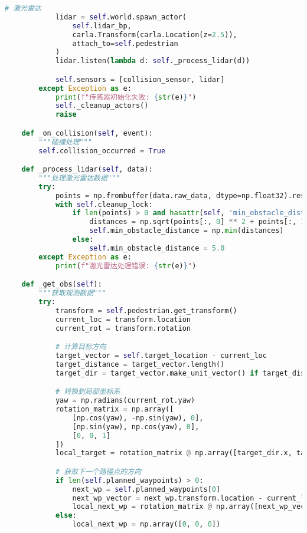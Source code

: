 \begin{lstlisting}[language=Python]
            # 激光雷达
            lidar = self.world.spawn_actor(
                self.lidar_bp,
                carla.Transform(carla.Location(z=2.5)),
                attach_to=self.pedestrian
            )
            lidar.listen(lambda d: self._process_lidar(d))

            self.sensors = [collision_sensor, lidar]
        except Exception as e:
            print(f"传感器初始化失败: {str(e)}")
            self._cleanup_actors()
            raise

    def _on_collision(self, event):
        """碰撞处理"""
        self.collision_occurred = True

    def _process_lidar(self, data):
        """处理激光雷达数据"""
        try:
            points = np.frombuffer(data.raw_data, dtype=np.float32).reshape(-1, 4)
            with self.cleanup_lock:
                if len(points) > 0 and hasattr(self, 'min_obstacle_distance'):
                    distances = np.sqrt(points[:, 0] ** 2 + points[:, 1] ** 2)
                    self.min_obstacle_distance = np.min(distances)
                else:
                    self.min_obstacle_distance = 5.0
        except Exception as e:
            print(f"激光雷达处理错误: {str(e)}")

    def _get_obs(self):
        """获取观测数据"""
        try:
            transform = self.pedestrian.get_transform()
            current_loc = transform.location
            current_rot = transform.rotation

            # 计算目标方向
            target_vector = self.target_location - current_loc
            target_distance = target_vector.length()
            target_dir = target_vector.make_unit_vector() if target_distance > 0 else carla.Vector3D()

            # 转换到局部坐标系
            yaw = np.radians(current_rot.yaw)
            rotation_matrix = np.array([
                [np.cos(yaw), -np.sin(yaw), 0],
                [np.sin(yaw), np.cos(yaw), 0],
                [0, 0, 1]
            ])
            local_target = rotation_matrix @ np.array([target_dir.x, target_dir.y, target_dir.z])

            # 获取下一个路径点的方向
            if len(self.planned_waypoints) > 0:
                next_wp = self.planned_waypoints[0]
                next_wp_vector = next_wp.transform.location - current_loc
                local_next_wp = rotation_matrix @ np.array([next_wp_vector.x, next_wp_vector.y, next_wp_vector.z])
            else:
                local_next_wp = np.array([0, 0, 0])


\end{lstlisting}
